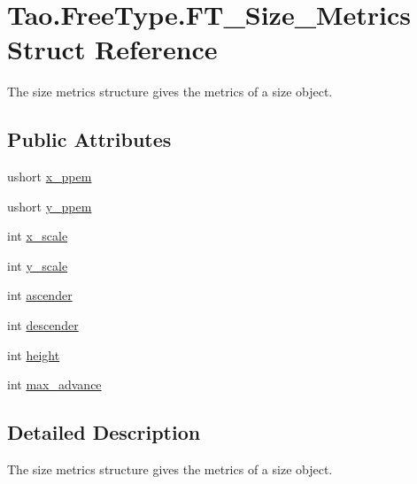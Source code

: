 \hypertarget{struct_tao_1_1_free_type_1_1_f_t___size___metrics}{
\section{Tao.FreeType.FT\_\-Size\_\-Metrics Struct Reference}
\label{struct_tao_1_1_free_type_1_1_f_t___size___metrics}
}


The size metrics structure gives the metrics of a size object.  


\subsection*{Public Attributes}
\begin{DoxyCompactItemize}
\item 
ushort \hyperlink{struct_tao_1_1_free_type_1_1_f_t___size___metrics_a4bdd1074a029b7bb9d9707e1ef6fdaae}{x\_\-ppem}
\item 
ushort \hyperlink{struct_tao_1_1_free_type_1_1_f_t___size___metrics_ad216c426102c1509e1df229daa80c5d6}{y\_\-ppem}
\item 
int \hyperlink{struct_tao_1_1_free_type_1_1_f_t___size___metrics_a67c35677944766e69c92cfb478a71d58}{x\_\-scale}
\item 
int \hyperlink{struct_tao_1_1_free_type_1_1_f_t___size___metrics_a27c36e3fe67e7f48630209e58813d21e}{y\_\-scale}
\item 
int \hyperlink{struct_tao_1_1_free_type_1_1_f_t___size___metrics_afa3ab36d3f317cd3d2304aa350637322}{ascender}
\item 
int \hyperlink{struct_tao_1_1_free_type_1_1_f_t___size___metrics_ab0f08dc0a220ec5dda0f2d8a4665752c}{descender}
\item 
int \hyperlink{struct_tao_1_1_free_type_1_1_f_t___size___metrics_a02f01633ee6af9023b6b11a0b68bd1c9}{height}
\item 
int \hyperlink{struct_tao_1_1_free_type_1_1_f_t___size___metrics_a0716dff0b06ad07ee6188721d0878f7f}{max\_\-advance}
\end{DoxyCompactItemize}


\subsection{Detailed Description}
The size metrics structure gives the metrics of a size object. 

